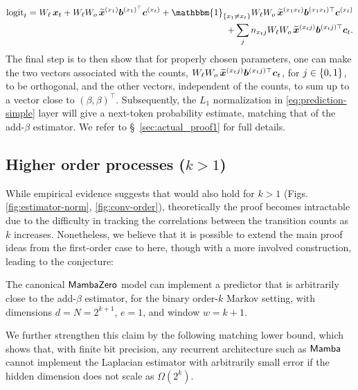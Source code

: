 \begin{equation*}
\begin{split}
    \logit_t = W_{\ell} \, \bx_t + W_{\ell}W_o \, \tilde{\bx}^{(x_1)}\bb^{(x_1)^\top} \bc^{(x_t)} 
	+ \mathbbm{1}_{\{x_1 \neq x_t\}} W_{\ell}W_o \, \tilde{\bx}^{(x_1 x_t)} \bb^{(x_1 x_t)\top} \bc^{(x_t)} \\
	+ \sum_{j} n_{x_t j} W_{\ell} W_o \, \tilde{\bx}^{(x_t j)} \bb^{(x_t j)\top} \bc_t.
\end{split}
\label{eq:logit-final}
\end{equation*}
The final step is to then show that for properly chosen parameters, one can make the two vectors associated with the counts, \ie $W_{\ell} W_o \, \widetilde{\boldsymbol{x}}^{(x_t j)} \boldsymbol{b}^{(x_t j)\top} \boldsymbol{c}_t$, for $ j \in\{0,1\}$, to be orthogonal, and the other vectors, independent of the counts, to sum up to a vector close to $(\beta, \beta)^\top$. Subsequently, the $L_1$ normalization in \ref{eq:prediction-simple} layer will give a next-token probability estimate, matching that of the add-$\beta$ estimator. We refer to \S~\ref{sec:actual_proof1} for full details.  

\subsection{Higher order processes ($k>1$)}
While empirical evidence suggests that  would also hold for $k>1$ (Figs. \ref{fig:estimator-norm}, \ref{fig:conv-order}), theoretically the proof becomes intractable due to the difficulty in tracking the correlations between the transition counts as $k$ increases. Nonetheless, we believe that it is possible to extend the main proof ideas from the first-order case to here, though with a more involved construction, leading to the conjecture:
\begin{conjecture}
\label{conj:orderk}
The canonical $\mathsf{MambaZero}$ model can implement a predictor that is arbitrarily close to the add-$\beta$ estimator, for the binary order-$k$ Markov setting, with dimensions $d = N = 2^{k+1}$, $e=1$, and window $w=k+1$.
\end{conjecture}


We further strengthen this claim by the following matching lower bound, which shows that, with finite bit precision, any recurrent architecture such as $\mathsf{Mamba}$ cannot implement the Laplacian estimator with arbitrarily small error if the hidden dimension does not scale as $\Omega(2^k)$.

